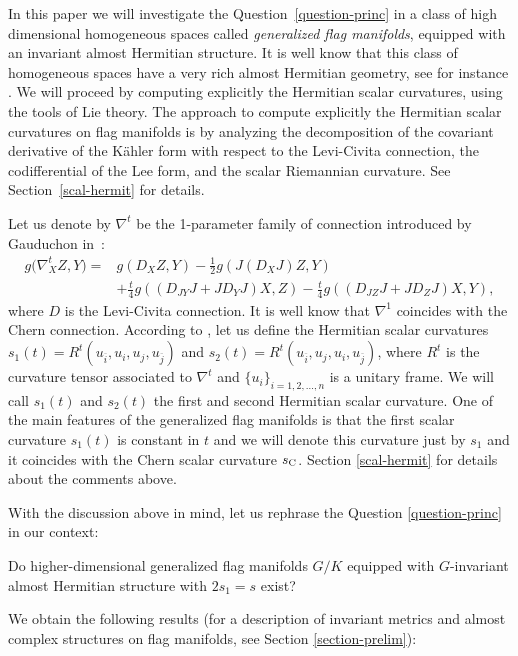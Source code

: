 \documentclass[pdftex]{sigma}%
\numberwithin{equation}{section}
\begin{document}
In this paper we will investigate the Question~\ref{question-princ} in a class of high dimensional homogeneous spaces called {\it generalized flag manifolds}, equipped with an invariant almost Hermitian structure. It is well know that this class of homogeneous spaces have a very rich almost Hermitian geometry, see for instance \cite{rita, sn}. We will proceed by computing explicitly the Hermitian scalar curvatures, using the tools of Lie theory. The approach to compute explicitly the Hermitian scalar curvatures on flag manifolds is by analyzing the decomposition of the covariant derivative of the K\"ahler form with respect to the Levi-Civita connection, the codifferential of the Lee form, and the scalar Riemannian curvature. See Section~\ref{scal-hermit} for details.

Let us denote by $\nabla^t$ be the 1-parameter family of connection introduced by Gauduchon in~\cite{gau}:
\begin{align*}
g\big(\nabla^{t}_{X}Z,Y\big)={}&g(D_{X}Z,Y)-\frac{1}{2}g(J(D_{X}J)Z,Y)
\\
&+\frac{t}{4}g((D_{JY}J+JD_{Y}J)X,Z)-\frac{t}{4}g((D_{JZ}J+JD_{Z}J)X,Y),
\end{align*}
where $D$ is the Levi-Civita connection.
 It is well know that $\nabla^1$ coincides with the Chern connection.
 According to \cite{fu}, let us define the Hermitian scalar curvatures $s_{1}(t)=R^{t}(u_{\overline{i}},u_{i},u_{j},u_{\overline{j}})$
and $s_{2}(t)=R^{t}(u_{\overline{i}},u_{j},u_{i},u_{\overline{j}})$,
where $R^{t}$ is the curvature tensor associated to $\nabla^{t}$ and $\{u_{i}\}_{i=1,2,\dots,n}$ is a unitary frame. We will call $s_1(t)$ and $s_2(t)$ the first and second Hermitian scalar curvature. One of the main features of the generalized flag manifolds is that the first scalar curvature $s_1(t)$ is constant in $t$ and we will denote this curvature just by $s_1$ and it coincides with the Chern scalar curvature $s_{\rm C}$. Section \ref{scal-hermit} for details about the comments above.

With the discussion above in mind, let us rephrase the Question \ref{question-princ} in our context:
\begin{Question} %
Do higher-dimensional generalized flag manifolds $G/K$ equipped with $G$-inva\-ri\-ant almost Hermitian structure with $2s_{1}=s$ exist?
\end{Question}

We obtain the following results (for a description of invariant metrics and almost complex structures on flag manifolds, see Section \ref{section-prelim}):
\end{document}

